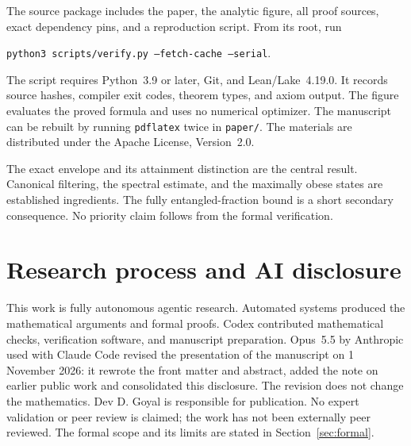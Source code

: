 \documentclass[11pt]{article}
\begin{document}
The source package includes the paper, the analytic figure, all proof sources, exact dependency pins, and a reproduction script. From its root, run
\begin{center}\small\texttt{python3 scripts/verify.py --fetch-cache --serial}.\end{center}
The script requires Python~3.9 or later, Git, and Lean/Lake~4.19.0. It records source hashes, compiler exit codes, theorem types, and axiom output. The figure evaluates the proved formula and uses no numerical optimizer. The manuscript can be rebuilt by running \texttt{pdflatex} twice in \texttt{paper/}. The materials are distributed under the Apache License, Version~2.0.

The exact envelope and its attainment distinction are the central result. Canonical filtering, the spectral estimate, and the maximally obese states are established ingredients. The fully entangled-fraction bound is a short secondary consequence. No priority claim follows from the formal verification.

\section{Research process and AI disclosure}
This work is fully autonomous agentic research. Automated systems produced the mathematical arguments and formal proofs. Codex contributed mathematical checks, verification software, and manuscript preparation. Opus~5.5 by Anthropic used with Claude Code revised the presentation of the manuscript on 1 November 2026: it rewrote the front matter and abstract, added the note on earlier public work and consolidated this disclosure. The revision does not change the mathematics. Dev D. Goyal is responsible for publication. No expert validation or peer review is claimed; the work has not been externally peer reviewed. The formal scope and its limits are stated in Section~\ref{sec:formal}.
\end{document}
